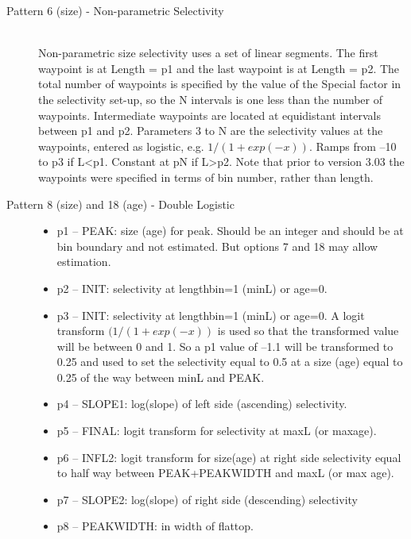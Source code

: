 \begin{description}
	\item[Pattern 6 (size) - Non-parametric Selectivity]\hfil\\
	Non-parametric size selectivity uses a set of linear segments.  The first waypoint is at Length = p1 and the last waypoint is at Length = p2.  The total number of waypoints is specified by the value of the Special factor in the selectivity set-up, so the N intervals is one less than the number of waypoints.  Intermediate waypoints are located at equidistant intervals between p1 and p2.  Parameters 3 to N are the selectivity values at the waypoints, entered as logistic, e.g. $1/(1+exp(-x))$.  Ramps from –10 to p3 if L<p1.  Constant at pN if L>p2.  Note that prior to version 3.03 the waypoints were specified in terms of bin number, rather than length.
\end{description}

\begin{description}
	\item[Pattern 8 (size) and 18 (age) - Double Logistic]\hfil
	\begin{itemize}
		\item  p1 – PEAK:  size (age) for peak. Should be an integer and should be at bin boundary and not estimated.  But options 7 and 18 may allow estimation.
		\item p2 – INIT:  selectivity at lengthbin=1 (minL) or age=0.
		\item p3 – INIT:  selectivity at lengthbin=1 (minL) or age=0. A logit transform $(1/(1+exp(-x))$ is used so that the transformed value will be between 0 and 1.  So a p1 value of –1.1 will be transformed to 0.25 and used to set the selectivity equal to 0.5 at a size (age) equal to 0.25 of the way between minL and PEAK. 
		\item p4 – SLOPE1:  log(slope) of left side (ascending) selectivity.
		\item p5 – FINAL:  logit transform for selectivity at maxL (or maxage).
		\item p6 – INFL2:  logit transform for size(age) at right side selectivity equal to half way between PEAK+PEAKWIDTH and maxL (or max age).
		\item p7 – SLOPE2:  log(slope) of right side (descending) selectivity
		\item p8 – PEAKWIDTH:  in width of flattop.
	\end{itemize}
\end{description}

